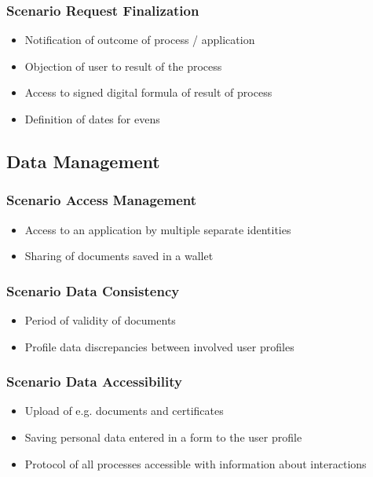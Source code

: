 \documentclass[
     12pt,         %
     a4paper,      %
     BCOR=10mm,version=first,     %
     DIV=14,version=first,        %
     ]{scrreprt}
\begin{document}
\subsubsection{Scenario Request Finalization}
\begin{itemize}
    \item Notification of outcome of process / application
    \item Objection of user to result of the process
    \item Access to signed digital formula of result of process
    \item Definition of dates for evens
\end{itemize}

\subsection{Data Management}

\subsubsection{Scenario Access Management}
\begin{itemize}
    \item Access to an application by multiple separate identities
    \item Sharing of documents saved in a wallet
\end{itemize}

\subsubsection{Scenario Data Consistency}
\begin{itemize}
    \item Period of validity of documents
    \item Profile data discrepancies between involved user profiles
\end{itemize}

\subsubsection{Scenario Data Accessibility}
\begin{itemize}
    \item Upload of e.g. documents and certificates
    \item Saving personal data entered in a form to the user profile
    \item Protocol of all processes accessible with information about interactions
\end{itemize}
\end{document}
